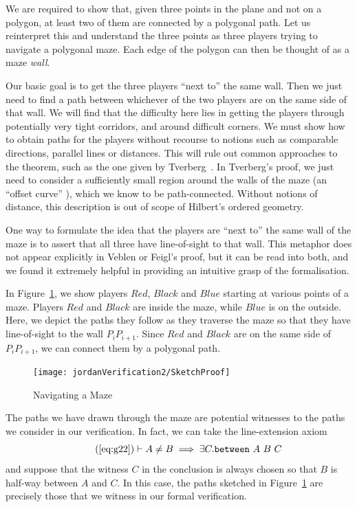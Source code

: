 We are required to show that, given three points in the plane and not on a polygon, at least two of them are connected by a polygonal path. Let us reinterpret this and understand the three points as three players trying to navigate a polygonal maze. Each edge of the polygon can then be thought of as a maze \emph{wall}.

Our basic goal is to get the three players ``next to'' the same wall. Then we just need to find a path between whichever of the two players are on the same side of that wall. We will find that the difficulty here lies in getting the players through potentially very tight corridors, and around difficult corners. We must show how to obtain paths for the players without recourse to notions such as comparable directions, parallel lines or distances. This will rule out common approaches to the theorem, such as the one given by Tverberg~\cite{TverbergJordan}. In Tverberg's proof, we just need to consider a sufficiently small region around the walls of the maze (an ``offset curve'' ), which we know to be path-connected. Without notions of distance, this description is out of scope of Hilbert's ordered geometry.

One way to formulate the idea that the players are ``next to'' the same wall of the maze is to assert that all three have line-of-sight to that wall. This metaphor does not appear explicitly in Veblen or Feigl's proof, but it can be read into both, and we found it extremely helpful in providing an intuitive grasp of the formalisation.

In Figure~\ref{fig:SketchProofJordan2}, we show players $Red$, $Black$ and $Blue$ starting at various points of a maze. Players $Red$ and $Black$ are inside the maze, while $Blue$ is on the outside. Here, we depict the paths they follow as they traverse the maze so that they have line-of-sight to the wall $P_iP_{i+1}$. Since $Red$ and $Black$ are on the same side of $P_iP_{i+1}$, we can connect them by a polygonal path.

\begin{figure}
  \centering\texttt{[image: jordanVerification2/SketchProof]}
  \caption{Navigating a Maze}
  \label{fig:SketchProofJordan2}
\end{figure}

The paths we have drawn through the maze are potential witnesses to the paths we consider in our verification. In fact, we can take the line-extension axiom 
\begin{equation}
  \tag{\ref{eq:g22}}
  \vdash A \neq B \implies \exists C. \between{A}{B}{C}
\end{equation}
and suppose that the witness $C$ in the conclusion is always chosen so that $B$ is half-way between $A$ and $C$. In this case, the paths sketched in Figure~\ref{fig:SketchProofJordan2} are precisely those that we witness in our formal verification.

